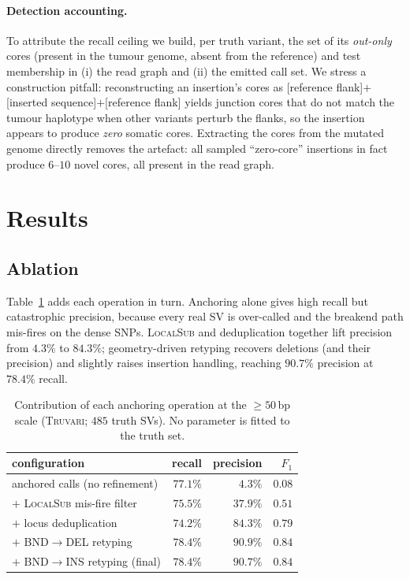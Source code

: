 \documentclass[11pt]{article}
\begin{document}
\paragraph{Detection accounting.}
\label{sec:truth}
To attribute the recall ceiling we build, per truth variant, the set of its \emph{out-only} cores
(present in the tumour genome, absent from the reference) and test membership in (i) the read
graph and (ii) the emitted call set. We stress a construction pitfall: reconstructing an
insertion's cores as [reference flank]$+$[inserted sequence]$+$[reference flank] yields junction
cores that do not match the tumour haplotype when other variants perturb the flanks, so the
insertion appears to produce \emph{zero} somatic cores. Extracting the cores from the mutated
genome directly removes the artefact: all sampled ``zero-core'' insertions in fact produce
$6$--$10$ novel cores, all present in the read graph.

\section{Results}
\label{sec:results}

\subsection{Ablation}
Table~\ref{tab:ablation} adds each operation in turn. Anchoring alone gives high recall but
catastrophic precision, because every real SV is over-called and the breakend path mis-fires on
the dense SNPs. \textsc{LocalSub} and deduplication together lift precision from $4.3\%$ to
$84.3\%$; geometry-driven retyping recovers deletions (and their precision) and slightly raises
insertion handling, reaching $90.7\%$ precision at $78.4\%$ recall.

\begin{table}[t]
\centering
\begin{tabular}{lrrr}
\toprule
configuration & recall & precision & $F_1$ \\
\midrule
anchored calls (no refinement)            & $77.1\%$ & $4.3\%$  & $0.08$ \\
\; $+$ \textsc{LocalSub} mis-fire filter  & $75.5\%$ & $37.9\%$ & $0.51$ \\
\; $+$ locus deduplication                & $74.2\%$ & $84.3\%$ & $0.79$ \\
\; $+$ BND$\to$DEL retyping                & $78.4\%$ & $90.9\%$ & $0.84$ \\
\; $+$ BND$\to$INS retyping (final)        & $78.4\%$ & $90.7\%$ & $0.84$ \\
\bottomrule
\end{tabular}
\caption{Contribution of each anchoring operation at the $\geq 50$\,bp scale (\textsc{Truvari};
$485$ truth SVs). No parameter is fitted to the truth set.}
\label{tab:ablation}
\end{table}
\end{document}
